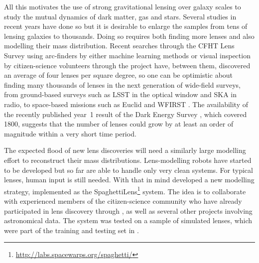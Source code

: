 All this motivates the use of strong gravitational lensing over galaxy
scales to study the mutual dynamics of dark matter, gas and stars.
Several studies in recent years have done so \citep[see,
  e.g.,][]{2009ApJ...703L..51K,2011ApJ...740...97L,2012MNRAS.424..104L,
  2016MNRAS.459.3677L,2016MNRAS.456..870B} but it is desirable to
enlarge the samples from tens of lensing galaxies to thousands.  Doing
so requires both finding more lenses and also modelling their mass
distribution.  Recent searches through the CFHT Lens Survey
\citep[CFHTLS;][]{2012MNRAS.427..146H} using arc-finders
\citep[e.g.][]{2012ApJ...749...38M,2014A&A...567A.111M,2014ApJ...785..144G,2017arXiv170401585S}
by either machine learning methods
\citep[e.g.,][]{2016A&A...592A..75P,2017arXiv170302642L} or visual
inspection by citizen-science volunteers through the \SW project
\citep{2016MNRAS.455.1191M} have, between them, discovered an average
of four lenses per square degree, so one can be optimistic about
finding many thousands of lenses in the next generation of wide-field
surveys, from ground-based surveys such as LSST in the optical window
and SKA in radio, to space-based missions such as Euclid and WFIRST
\citep{2010MNRAS.405.2579O,2015ApJ...811...20C}.  The availability of
the recently published year~1 result of the Dark Energy Survey
\citep{2017arXiv170801531D}, which covered 1800\sqdeg, suggests that
the number of lenses could grow by at least an order of magnitude
within a very short time period.

The expected flood of new lens discoveries will need a similarly large
modelling effort to reconstruct their mass distributions.
Lens-modelling robots have started to be developed
\citep{2017arXiv170807377N,2017arXiv170808842H} but so far are able to
handle only very clean systems.  For typical lenses, human input is
still needed.  With that in mind \cite{2015MNRAS.447.2170K} developed
a new modelling strategy, implemented as the SpaghettiLens\footnote{\url{http://labs.spacewarps.org/spaghetti/}}
system.
The idea is to collaborate with experienced members of the
citizen-science community who have already participated in lens
discovery through \SW, as well as several other projects involving
astronomical data.  The system was tested on a sample of simulated
lenses, which were part of the training and testing set in \SW.

